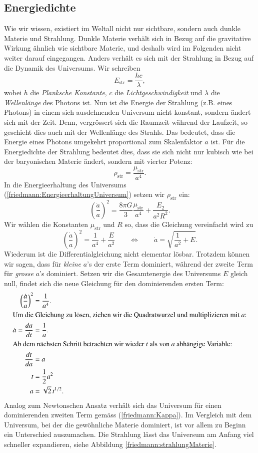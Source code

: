 \begin{refsection}
\subsection*{Energiedichte}
Wie wir wissen, existiert im Weltall nicht nur sichtbare, sondern auch dunkle Materie und Strahlung. Dunkle Materie verhält sich in Bezug auf die gravitative Wirkung ähnlich wie sichtbare Materie, und deshalb wird im Folgenden nicht weiter darauf eingegangen.
Anders verhält es sich mit der Strahlung in Bezug auf die Dynamik des Universums. Wir schreiben
\[ E_\text{str} = \frac{h c}{\lambda}, \]
wobei $h$ die {\em Planksche Konstante}, $c$ die {\em Lichtgeschwindigkeit} und $\lambda$ die {\em Wellenlänge} des Photons ist.
Nun ist die Energie der Strahlung (z.B. eines Photons) in einem sich ausdehnenden Universum nicht konstant, sondern ändert sich mit der Zeit. 
Denn, vergrössert sich die Raumzeit während der Laufzeit, so geschieht dies auch mit der Wellenlänge des Strahls. Das bedeutet, dass die Energie eines Photons umgekehrt proportional zum Skalenfaktor $a$ ist. Für die Energiedichte der Strahlung bedeutet dies, dass sie sich nicht nur kubisch wie bei der baryonischen Materie ändert, sondern mit vierter Potenz:
\begin{equation}
\rho_\text{str} = \frac{\mu_{\text{str}}}{a^4}.
\end{equation}
In die Energieerhaltung des Universums (\ref{friedmann:EnergieerhaltungUniversum}) setzen wir $\rho_\text{str}$ ein:
\[\left(\frac{\dot{a}}{a} \right)^2 = \frac{8 \pi G}{3} \frac{\mu_{\text{str}}}{a^4} + \frac{E_2}{a^2 R^2}.\]
Wir wählen die Konstanten $\mu_{\text{str}}$ und $R$ so, dass die Gleichung vereinfacht wird zu
\[\left(\frac{\dot{a}}{a} \right)^2 = \frac{1}{a^4} + \frac{E}{a^2} \qquad \Leftrightarrow \qquad\dot{a} = \sqrt{\frac{1}{a^2} + E}.\]
Wiederum ist die Differentialgleichung nicht elementar lösbar. Trotzdem können wir sagen, dass für {\em kleine} $a$'s der erste Term dominiert, während der zweite Term für {\em grosse} $a$'s dominiert. Setzen wir die Gesamtenergie des Universums $E$ gleich null, findet sich die neue Gleichung für den dominierenden ersten Term:
\begin{align}
	\nonumber\left(\frac{\dot{a}}{a} \right)^2 &= \frac{1}{a^4}.\\
	\intertext{Um die Gleichung zu lösen, ziehen wir die Quadratwurzel und multiplizieren mit $a$:}
	\nonumber\dot{a} = \frac{da}{dt} &=\frac{1}{a}.\\
	\intertext{Ab dem nächsten Schritt betrachten wir wieder $t$ als von $a$ abhängige Variable:}
	\nonumber\frac{dt}{da} &= a\\
	\nonumber t &= \frac{1}{2} a^{2}\\
	a &= \sqrt{2}\,t^{1/2}. 
\end{align}
Analog zum Newtonschen Ansatz verhält sich das Universum für einen dominierenden zweiten Term gemäss (\ref{friedmann:Kappa}). 
Im Vergleich mit dem Universum, bei der die gewöhnliche Materie dominiert, ist vor allem zu Beginn ein Unterschied auszumachen. Die Strahlung lässt das Universum am Anfang viel schneller expandieren, siehe Abbildung \ref{friedmann:strahlungMaterie}. 


\end{refsection}
